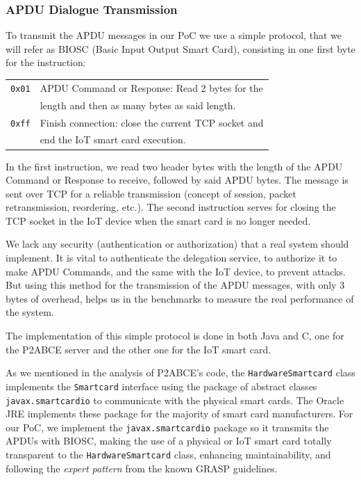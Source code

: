 \subsubsection{APDU Dialogue Transmission}


To transmit the APDU messages in our PoC we use a simple protocol, that we will refer as BIOSC (Basic Input Output Smart Card), consisting in one first byte for the instruction: 

\hfil

\begin{tabular}{|c|l|}
	\hline
	\texttt{0x01} & APDU Command or Response: Read 2 bytes for the\\& length and then as many bytes as said length. \\
	\hline
	\texttt{0xff} & Finish connection: close the current TCP socket and\\& end the IoT smart card execution. \\
	\hline
\end{tabular}

\hfil

In the first instruction, we read two header bytes with the length of the APDU Command or Response to receive, followed by said APDU bytes. The message is sent over TCP for a reliable transmission (concept of session, packet retransmission, reordering, etc.). The second instruction serves for closing the TCP socket in the IoT device when the smart card is no longer needed.

We lack any security (authentication or authorization) that a real system should implement. It is vital to authenticate the delegation service, to authorize it to make APDU Commands, and the same with the IoT device, to prevent attacks. But using this method for the transmission of the APDU messages, with only 3 bytes of overhead, helps us in the  benchmarks to measure the real performance of the system.


\hfil


The implementation of this simple protocol is done in both Java and C, one for the P2ABCE server and the other one for the IoT smart card.

\hfil

As we mentioned in the analysis of P2ABCE's code, the \texttt{HardwareSmartcard} class implements the \texttt{Smartcard} interface using the package of abstract classes \texttt{javax.smartcardio} to communicate with the physical smart cards. The Oracle JRE implements these package for the majority of smart card manufacturers. For our PoC, we implement the \texttt{javax.smartcardio} package so it transmits the APDUs with BIOSC, making the use of a physical or IoT smart card totally transparent to the \texttt{HardwareSmartcard} class, enhancing maintainability, and following the \textit{expert pattern} from the known GRASP guidelines.

